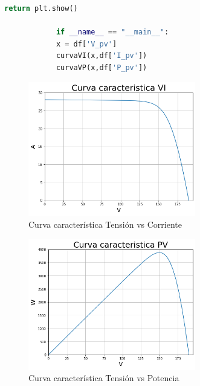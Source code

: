 \documentclass[a4paper,12pt]{article}
\begin{document}
\begin{itemize}
\begin{lstlisting}[language=Python, caption=Python example]
			return plt.show()
			
			if __name__ == "__main__":
			x = df['V_pv']
			curvaVI(x,df['I_pv'])
			curvaVP(x,df['P_pv'])
		\end{lstlisting}
		
		\begin{figure}[htb]
			\centering
			\includegraphics[width=0.65\textwidth]{./imagenes/curvaVI.png}
			\caption{Curva característica Tensión vs Corriente}
		\end{figure} 
		
		\newpage
		
		\begin{figure}[htb]
			\centering
			\includegraphics[width=0.65\textwidth]{./imagenes/curvaPV.png}
			\caption{Curva característica Tensión vs Potencia}
		\end{figure} 
		
		
		
		
		
		
	\end{itemize}
	
	
	 
	
	 
	

	
	
	
	
	

	

	
\end{document}
